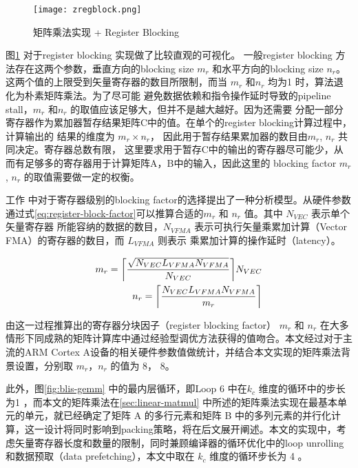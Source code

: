 \begin{figure}
\centering
\texttt{[image: zregblock.png]}
\caption{矩阵乘法实现 + Register Blocking}
\label{fig:zregblock}
\end{figure}

图\ref{fig:zregblock} 对于register blocking 实现做了比较直观的可视化。
一般register blocking 方法存在这两个参数，垂直方向的blocking size $m_r$ 和水平方向的blocking size $ n_r $。
这两个值的上限受到矢量寄存器的数目所限制，而当 $m_r$ 和$n_r$ 均为1 时，算法退化为朴素矩阵乘法。为了尽可能
避免数据依赖和指令操作延时导致的pipeline stall，$m_r$ 和$n_r$ 的取值应该足够大，但并不是越大越好。因为还需要
分配一部分寄存器作为累加器暂存结果矩阵C中的值。在单个的register blocking计算过程中，计算输出的
结果的维度为 $m_r \times n_r$， 因此用于暂存结果累加器的数目由$m_r$, $n_r$ 共同决定。寄存器总数有限，
这里要求用于暂存C中的输出的寄存器尽可能少，从而有足够多的寄存器用于计算矩阵A，B中的输入，因此这里的
blocking factor $m_r$, $n_r$ 的取值需要做一定的权衡。

工作\cite{Low2016AnalyticalMI} 中对于寄存器级别的blocking factor的选择提出了一种分析模型。从硬件参数
通过式\ref{eq:register-block-factor}可以推算合适的$m_r$ 和 $n_r$ 值。其中 $N_{VEC}$ 表示单个矢量寄存器
所能容纳的数据的数目，$N_{VFMA}$ 表示可执行矢量乘累加计算（Vector FMA）的寄存器的数目，而 $L_{VFMA}$ 则表示
乘累加计算的操作延时（latency）。

\begin{align}
  \label{eq:register-block-factor}
  m_r = \ceil[\bigg]{\frac{\sqrt{N_{VEC}L_{VFMA}N_{VFMA}}}{N_{VEC}}} N_{VEC} \\
  n_r = \ceil[\bigg]{\frac{N_{VEC}L_{VFMA}N_{VFMA}}{m_r}}
\end{align}

由这一过程推算出的寄存器分块因子（register blocking factor） $m_r$ 和 $n_r$ 在大多情形下同成熟的矩阵计算库中通过经验型调优方法获得的值吻合。本文经过对于主流的ARM Cortex A设备的相关硬件参数值做统计，并结合本文实现的矩阵乘法背景设置，分别取 $m_r$，$n_r$ 的值为 8， 8。

此外，图\ref{fig:blis-gemm} 中的最内层循环，即Loop 6 中在$k_c$ 维度的循环中的步长为1 ，而本文的矩阵乘法在\ref{sec:linear-matmul} 中所述的矩阵乘法实现在最基本单元的单元，就已经确定了矩阵 A 的多行元素和矩阵 B 中的多列元素的并行化计算，这一设计将同时影响到packing策略，将在后文展开阐述。本文的实现中，考虑矢量寄存器长度和数量的限制，同时兼顾编译器的循环优化中的loop unrolling和数据预取（data prefetching），本文中取在 $k_c$ 维度的循环步长为 4 。

